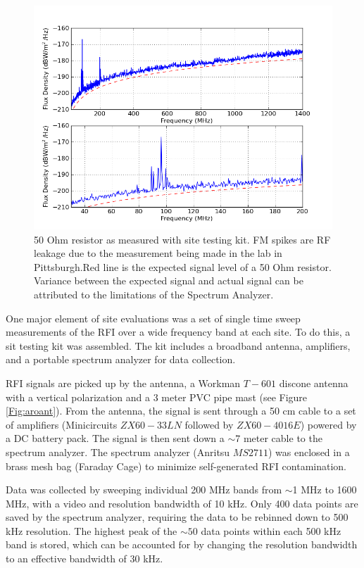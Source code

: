 \begin{figure}[htb]
\begin{center}
\includegraphics[width=0.9\linewidth]{RFI_testing/figures/50Ohm_cal.png}
\caption{50 Ohm resistor as measured with site testing kit. FM spikes are RF leakage due to the measurement being made in the lab in Pittsburgh.Red line is the expected signal level of a 50 Ohm resistor. Variance between the expected signal and actual signal can be attributed to the limitations of the Spectrum Analyzer.}
\label{Fig:resflux}
\end{center}
\end{figure}

One major element of site evaluations was a set of single time sweep measurements of the RFI over a wide frequency band at each site. To do this, a sit testing kit was assembled. The kit includes a broadband antenna, amplifiers, and a portable spectrum analyzer for data collection. 

RFI signals are picked up by the antenna, a Workman $T-601$ discone antenna with a vertical polarization and a 3 meter PVC pipe mast (see Figure \ref{Fig:aroant}). From the antenna, the signal is sent through a 50 cm cable to a set of amplifiers (Minicircuits $ZX60-33LN$ followed by $ZX60-4016E$) powered by a DC battery pack. The signal is then sent down a $\sim$7 meter cable to the spectrum analyzer. The spectrum analyzer (Anritsu $MS2711$) was enclosed in a brass mesh bag (Faraday Cage) to minimize self-generated RFI contamination. 

Data was collected by sweeping individual 200 MHz bands from $\sim$1 MHz to 1600 MHz, with a video and resolution bandwidth of 10 kHz. Only 400 data points are saved by the spectrum analyzer, requiring the data to be rebinned down to 500 kHz resolution. The highest peak of the $\sim50$ data points within each 500 kHz band is stored, which can be accounted for by changing the resolution bandwidth to an effective bandwidth of 30 kHz. 

